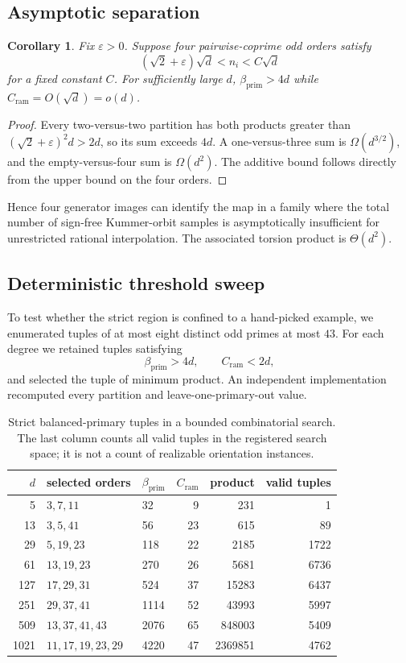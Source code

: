 \documentclass[11pt]{article}
\newtheorem{corollary}[theorem]{Corollary}
\newcommand{\Cr}{C_{\mathrm{ram}}}
\newcommand{\betaP}{\beta_{\mathrm{prim}}}
\begin{document}
\subsection{Asymptotic separation}

\begin{corollary}\label{cor:asymptotic}
Fix $\varepsilon>0$.  Suppose four pairwise-coprime odd orders satisfy
\[
 (\sqrt2+\varepsilon)\sqrt d<n_i<C\sqrt d
\]
for a fixed constant $C$.  For sufficiently large $d$,
$\betaP>4d$ while $\Cr=O(\sqrt d)=o(d)$.
\end{corollary}

\begin{proof}
Every two-versus-two partition has both products greater than
$(\sqrt2+\varepsilon)^2d>2d$, so its sum exceeds $4d$.  A one-versus-three
sum is $\Omega(d^{3/2})$, and the empty-versus-four sum is $\Omega(d^2)$.
The additive bound follows directly from the upper bound on the four orders.
\end{proof}

Hence four generator images can identify the map in a family where the total
number of sign-free Kummer-orbit samples is asymptotically insufficient for
unrestricted rational interpolation.  The associated torsion product is
$\Theta(d^2)$.

\subsection{Deterministic threshold sweep}

To test whether the strict region is confined to a hand-picked example, we
enumerated tuples of at most eight distinct odd primes at most $43$.  For each
degree we retained tuples satisfying
\[
 \betaP>4d,
 \qquad
 \Cr<2d,
\]
and selected the tuple of minimum product.  An independent implementation
recomputed every partition and leave-one-primary-out value.

\begin{table}[h]
\centering
\begin{tabular}{rllrrr}
\toprule
$d$ & selected orders & $\betaP$ & $\Cr$ & product & valid tuples\\
\midrule
5    & $3,7,11$       & 32   & 9  & 231     & 1\\
13   & $3,5,41$       & 56   & 23 & 615     & 89\\
29   & $5,19,23$      & 118  & 22 & 2185    & 1722\\
61   & $13,19,23$     & 270  & 26 & 5681    & 6736\\
127  & $17,29,31$     & 524  & 37 & 15283   & 6437\\
251  & $29,37,41$     & 1114 & 52 & 43993   & 5997\\
509  & $13,37,41,43$  & 2076 & 65 & 848003  & 5409\\
1021 & $11,17,19,23,29$ & 4220 & 47 & 2369851 & 4762\\
\bottomrule
\end{tabular}
\caption{Strict balanced-primary tuples in a bounded combinatorial search.
The last column counts all valid tuples in the registered search space; it is
not a count of realizable orientation instances.}
\label{tab:threshold-sweep}
\end{table}
\end{document}
